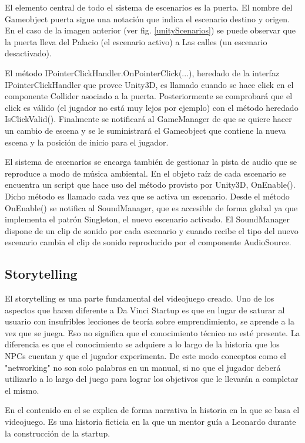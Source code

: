 El elemento central de todo el sistema de escenarios es la puerta. El nombre del Gameobject puerta sigue una notación que indica el escenario destino y origen. En el caso de la imagen anterior (ver fig. \ref{unityScenarios}) se puede observar que la puerta lleva del Palacio (el escenario activo) a Las calles (un escenario desactivado).

El método IPointerClickHandler.OnPointerClick(...), heredado de la interfaz IPointerClickHandler que provee Unity3D, es llamado cuando se hace click en el componente Collider asociado a la puerta. Posteriormente se comprobará que el click es válido (el jugador no está muy lejos por ejemplo) con el método heredado IsClickValid(). Finalmente se notificará al GameManager de que se quiere hacer un cambio de escena y se le suministrará el Gameobject que contiene la nueva escena y la posición de inicio para el jugador.

El sistema de escenarios se encarga también de gestionar la pista de audio que se reproduce a modo de música ambiental. En el objeto raíz de cada escenario se encuentra un script que hace uso del método provisto por Unity3D, OnEnable(). Dicho método es llamado cada vez que se activa un escenario. Desde el método OnEnable() se notifica al SoundManager, que es accesible de forma global ya que implementa el patrón Singleton, el nuevo escenario activado. El SoundManager dispone de un clip de sonido por cada escenario y cuando recibe el tipo del nuevo escenario cambia el clip de sonido reproducido por el componente AudioSource.

\subsection{Storytelling}

El storytelling es una parte fundamental del videojuego creado. Uno de los aspectos que hacen diferente a Da Vinci Startup es que en lugar de saturar al usuario con insufribles lecciones de teoría sobre emprendimiento, se aprende a la vez que se juega. Eso no significa que el conocimiento técnico no esté presente. La diferencia es que el conocimiento se adquiere a lo largo de la historia que los NPCs cuentan y que el jugador experimenta. De este modo conceptos como el "networking" no son solo palabras en un manual, si no que el jugador deberá utilizarlo a lo largo del juego para lograr los objetivos que le llevarán a completar el mismo.


En el  contenido en el  se explica de forma narrativa la historia en la que se basa el videojuego. Es una historia ficticia en la que un mentor guía a Leonardo durante la construcción de la startup.